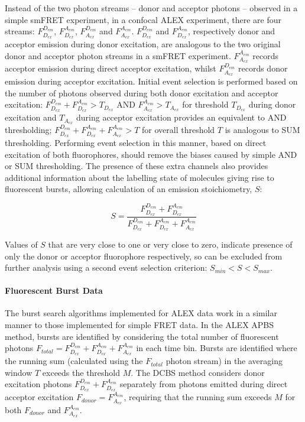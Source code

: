 Instead of the two photon streams -- donor and acceptor photons -- observed in a simple smFRET experiment, in a confocal ALEX experiment, there are four streams: $F_{D_{ex}}^{D_{em}}$, $F_{D_{ex}}^{A_{em}}$, $F_{A_{ex}}^{D_{em}}$ and $F_{A_{ex}}^{A_{em}}$. $F_{D_{ex}}^{D_{em}}$ and $F_{D_{ex}}^{A_{em}}$, respectively donor and acceptor emission during donor excitation, are analogous to the two original donor and acceptor photon streams in a smFRET experiment. $F_{A_{ex}}^{A_{em}}$ records acceptor emission during direct acceptor excitation, whilst $F_{A_{ex}}^{D_{em}}$ records donor emission during acceptor excitation. Initial event selection is performed based on the number of photons observed during both donor excitation and acceptor excitation: $F_{D_{ex}}^{D_{em}} + F_{D_{ex}}^{A_{em}} > T_{D_{ex}}$ AND $F_{A_{ex}}^{A_{em}} > T_{A_{ex}}$ for threshold $T_{D_{ex}}$ during donor excitation and $T_{A_{ex}}$ during acceptor excitation provides an equivalent to AND thresholding; $F_{D_{ex}}^{D_{em}} + F_{D_{ex}}^{A_{em}} + F_{A_{ex}}^{A_{em}} > T$ for overall threshold $T$ is analogous to SUM thresholding. Performing event selection in this manner, based on direct excitation of both fluorophores, should remove the biases caused by simple AND or SUM thresholding. The presence of these extra channels also provides additional information about the labelling state of molecules giving rise to fluorescent bursts, allowing calculation of an emission stoichiometry, $S$:

\begin{equation}
S = \frac{F_{D_{ex}}^{D_{em}} + F_{D_{ex}}^{A_{em}}}{F_{D_{ex}}^{D_{em}} + F_{D_{ex}}^{A_{em}} + F_{A_{ex}}^{A_{em}}}
\label{eq:stoichiometry}
\end{equation}

Values of $S$  that are very close to one or very close to zero, indicate presence of only the donor or acceptor fluorophore respectively, so can be excluded from further analysis using a second event selection criterion: $S_{min} < S < S_{max}$. 

\paragraph{Fluorescent Burst Data}
The burst search algorithms implemented for ALEX data work in a similar manner to those implemented for simple FRET data. In the ALEX APBS method, bursts are identified by considering the total number of fluorescent photons $F_{total} = F_{D_{ex}}^{D_{em}} + F_{D_{ex}}^{A_{em}} + F_{A_{ex}}^{A_{em}}$ in each time bin. Bursts are identified where the running sum (calculated using the  $F_{total}$ photon stream) in the averaging window $T$ exceeds the threshold $M$. The DCBS method considers donor excitation photons $F_{D_{ex}}^{D_{em}} + F_{D_{ex}}^{A_{em}}$ separately from photons emitted during direct acceptor excitation $F_{donor} = F_{A_{ex}}^{A_{em}}$, requiring that the running sum exceeds $M$ for both $F_{donor}$ and $F_{A_{ex}}^{A_{em}}$.

